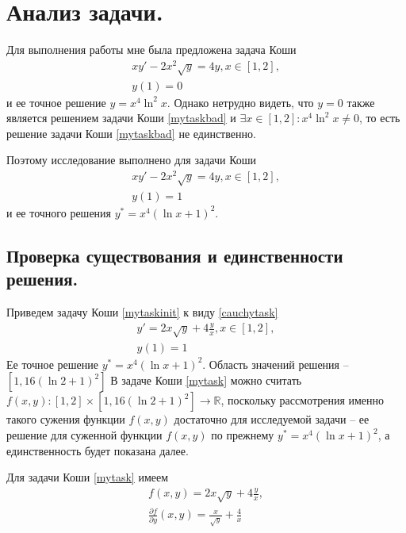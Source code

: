 \documentclass[a4paper, 12pt]{article}
\begin{document}
	\section{Анализ задачи.}

	Для выполнения работы мне была предложена задача Коши
	\begin{equation} \label{mytaskbad}
		\begin{gathered}
			xy'-2x^2\sqrt{y}=4y, x\in[1,2],\\
			y(1)=0
		\end{gathered}
	\end{equation}
	и ее точное решение $y=x^4\ln^2x$. Однако нетрудно видеть, что $y=0$ также является решением задачи Коши \eqref{mytaskbad} и $\exists x\in[1,2]: x^4\ln^2x\neq0$, то есть решение задачи Коши \eqref{mytaskbad} не единственно.
	
	Поэтому исследование выполнено для задачи Коши
	\begin{equation} \label{mytaskinit}
		\begin{gathered}
			xy'-2x^2\sqrt{y}=4y, x\in[1,2],\\
			y(1)=1
		\end{gathered}
	\end{equation}
	и ее точного решения $y^*=x^4(\ln x+1)^2$. 
	
	\subsection{Проверка существования и единственности решения.}
	\label{solexistance}
	
	Приведем задачу Коши \eqref{mytaskinit} к виду \eqref{cauchytask}
	\begin{equation} \label{mytask}
		\begin{gathered}
			y'=2x\sqrt{y}+4\frac{y}{x}, x\in[1,2],\\
			y(1)=1
		\end{gathered}
	\end{equation}
	Ее точное решение $y^*=x^4(\ln x+1)^2$. Область значений решения -- $[1, 16(\ln2+1)^2]$ В задаче Коши \eqref{mytask} можно считать $f(x,y):[1,2]\times[1, 16(\ln2+1)^2] \rightarrow \mathbb{R}$, поскольку рассмотрения именно такого сужения функции $f(x,y)$ достаточно для исследуемой задачи -- ее решение для суженной функции $f(x,y)$ по прежнему $y^*=x^4(\ln x+1)^2$, а единственность будет показана далее.
	
	Для задачи Коши \eqref{mytask} имеем
	\begin{equation*}
		\begin{gathered}
			f(x,y) = 2x\sqrt{y}+4\frac{y}{x},\\
			\frac{\partial f}{\partial y}(x,y) = \frac{x}{\sqrt{y}} + \frac{4}{x}
		\end{gathered}
	\end{equation*}
\end{document}
